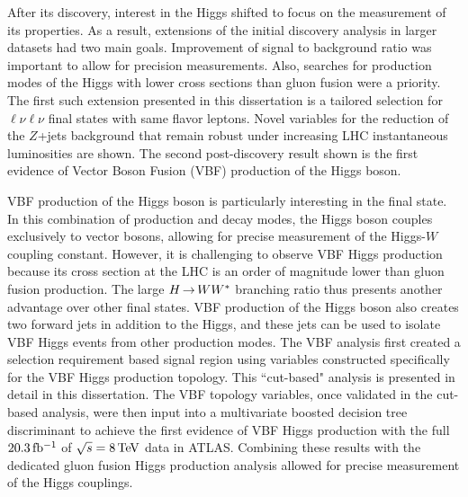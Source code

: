 After its discovery, interest in the Higgs shifted to focus on the measurement of its properties. As a result, extensions of the initial discovery analysis in larger datasets had two main goals. Improvement of signal to background ratio was important to allow for precision measurements. Also, searches for production modes of the Higgs with lower cross sections than gluon fusion were a priority. The first such extension presented in this dissertation is a tailored selection for $\ell\nu\ell\nu$ final states with same flavor leptons. Novel variables for the reduction of the $Z$+jets background that remain robust under increasing LHC instantaneous luminosities are shown. The second post-discovery result shown is the first evidence of Vector Boson Fusion (VBF) production of the Higgs boson. 

VBF production of the Higgs boson is particularly interesting in the \HWWfull final state. In this combination of production and decay modes, the Higgs boson couples exclusively to vector bosons, allowing for precise measurement of the Higgs-$W$ coupling constant. However, it is challenging to observe VBF Higgs production because its cross section at the LHC is an order of magnitude lower than gluon fusion production. The large $H{\,{\rightarrow}\,}WW^\ast$ branching ratio thus presents another advantage over other final states. VBF production of the Higgs boson also creates two forward jets in addition to the Higgs, and these jets can be used to isolate VBF Higgs events from other production modes. The VBF \HWWfull analysis first created a selection requirement based signal region using variables constructed specifically for the VBF Higgs production topology. This ``cut-based" analysis is presented in detail in this dissertation. The VBF topology variables, once validated in the cut-based analysis, were then input into a multivariate boosted decision tree discriminant to achieve the first evidence of VBF Higgs production with the full $20.3 \mbox{\,fb$^{-1}$}$ of $\sqrt{s} = 8 \TeV$ data in ATLAS. Combining these results with the dedicated gluon fusion Higgs production analysis allowed for precise measurement of the Higgs couplings. 

